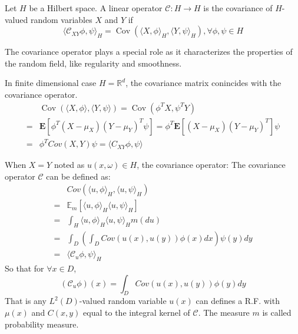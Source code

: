 \begin{definition}
  Let $H$ be a Hilbert space. A linear operator $\mathcal{C}:H\rightarrow H$ is the covariance of $H$-valued random variables $X$ and $Y$ if 
  \begin{equation}
      \langle\mathcal{C}_{XY}\phi, \psi\rangle_H = \operatorname{Cov}\left(\langle X, \phi\rangle_H, \langle Y, \psi\rangle_H\right), \forall \phi, \psi \in H
  \end{equation}
\end{definition}
The covariance operator plays a special role as it characterizes the properties of the random field, like regularity and smoothness.

\begin{example}[$H = \mathbb{R}^d$]
  In finite dimensional case $H = \mathbb{R}^d$, the covariance matrix conincides with the covariance operator. 
  \begin{equation}
      \begin{aligned}
          &\operatorname{Cov}\left(\langle X, \phi\rangle, \langle Y, \psi\rangle\right) 
          = \operatorname{Cov}\left(\phi^T X, \psi^T Y\right)\\
          =&\mathbf{E}\left[\phi^T(X-\mu_X)(Y-\mu_Y)^T\psi\right] 
          = \phi^T\mathbf{E}\left[(X-\mu_X)(Y-\mu_Y)^T\right]\psi\\
          =&\phi^T Cov(X, Y)\psi = \langle C_{XY}\phi, \psi\rangle
      \end{aligned}
  \end{equation}
\end{example}

\begin{example}[X=Y]
  When $X = Y$ noted as $u(x, \omega)\in H$, the covariance operator:
  The covariance operator $\mathcal{C}$ can be defined as:
  \begin{equation}
    \begin{aligned}
      &Cov\left(\langle u, \phi\rangle_{H}, \langle u, \psi\rangle_{H}\right)\\
      =&\mathbb{E}_m\left[\langle u, \phi\rangle_{H}\langle u, \psi\rangle_{H}\right]\\
      =& \int_{H}\langle u, \phi\rangle_{H}\langle u, \psi\rangle_{H} m(du)\\
      =&\int_D\left(\int_D Cov(u(x), u(y)) \phi(x) dx \right) \psi(y) dy\\
      =& \langle\mathcal{C}_u\phi, \psi\rangle_{H} 
    \end{aligned}
   \end{equation}
  So that for $\forall x\in D$,
  \begin{equation}
  (\mathcal{C}_u\phi)(x) = \int_D Cov(u(x), u(y)) \phi(y) dy
  \end{equation}
  That is any $L^2(D)$-valued random variable $u(x)$ can defines a R.F. with $\mu(x)$ and $C(x, y)$ equal to the integral kernel of $\mathcal{C}$.
  The measure $m$ is called probability measure.
\end{example}

